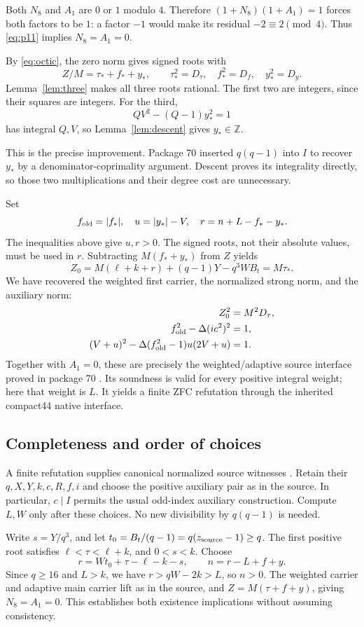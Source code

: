 \documentclass[11pt]{article}
\theoremstyle{definition}
\theoremstyle{remark}
\newcommand{\Z}{\mathbb Z}
\begin{document}
Both $N_8$ and $A_1$ are $0$ or $1$ modulo $4$. Therefore
$(1+N_8)(1+A_1)=1$ forces both factors to be $1$: a factor $-1$ would
make its residual $-2\equiv2\pmod4$. Thus \eqref{eq:p11} implies
$N_8=A_1=0$.

By \eqref{eq:octic}, the zero norm gives signed roots with
\[
 Z/M=\tau_*+f_*+y_*,\qquad
 \tau_*^2=D_\tau,\quad f_*^2=D_f,\quad y_*^2=D_y.
\]
Lemma~\ref{lem:three} makes all three roots rational. The first two are
integers, since their squares are integers. For the third,
\[
 QV^2-(Q-1)y_*^2=1
\]
has integral $Q,V$, so Lemma~\ref{lem:descent} gives $y_*\in\Z$.

This is the precise improvement. Package 70 inserted $q(q-1)$ into $I$
to recover $y_*$ by a denominator-coprimality argument. Descent proves its
integrality directly, so those two multiplications and their degree cost
are unnecessary.

Set
\[
 f_{\rm old}=|f_*|,\quad u=|y_*|-V,\quad
 r=n+L-f_*-y_*.
\]
The inequalities above give $u,r>0$. The signed roots, not their absolute
values, must be used in $r$. Subtracting $M(f_*+y_*)$ from $Z$ yields
\[
 Z_0=M(\ell+k+r)+(q-1)Y-q^3WB_t=M\tau_*.
\]
We have recovered the weighted first carrier, the normalized strong norm,
and the auxiliary norm:
\begin{align*}
 Z_0^2&=M^2D_\tau,\\
 f_{\rm old}^2-\Delta(ic^2)^2&=1,\\
 (V+u)^2-\Delta(f_{\rm old}^2-1)u(2V+u)&=1.
\end{align*}
Together with $A_1=0$, these are precisely the weighted/adaptive source
interface proved in package 70 \cite{source70}. Its soundness is valid for
every positive integral weight; here that weight is $L$. It yields a finite
ZFC refutation through the inherited compact44 native interface.

\subsection{Completeness and order of choices}

A finite refutation supplies canonical normalized source witnesses
\cite{source61,native44}. Retain their $q,X,Y,k,c,R,f,i$ and choose the
positive auxiliary pair as in the source. In particular, $c\mid I$ permits
the usual odd-index auxiliary construction. Compute $L,W$ only after these
choices. No new divisibility by $q(q-1)$ is needed.

Write $s=Y/q^3$, and let $t_0=B_t/(q-1)=q(z_{\rm source}-1)\ge q$.
The first positive root satisfies $\ell<\tau<\ell+k$, and $0<s<k$.
Choose
\[
 r=Wt_0+\tau-\ell-k-s,\qquad
 n=r-L+f+y.
\]
Since $q\ge16$ and $L>k$, we have
$r>qW-2k>L$, so $n>0$. The weighted carrier and adaptive main carrier
lift as in the source, and $Z=M(\tau+f+y)$, giving $N_8=A_1=0$.
This establishes both existence implications without assuming consistency.
\end{document}
